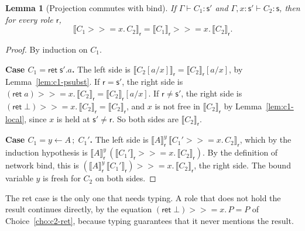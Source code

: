 \documentclass[11pt]{report}
\theoremstyle{plain}
\newtheorem{lemma}[theorem]{Lemma}
\theoremstyle{definition}
\theoremstyle{remark}
\newcommand{\kw}[1]{\mathsf{#1}}
\newcommand{\rr}{\mathsf{r}}
\newcommand{\sr}{\mathsf{s}}
\newcommand{\bind}[3]{#1 \leftarrow #2\,;\;#3}
\newcommand{\cret}[1]{\kw{ret}\;#1}
\newcommand{\mbind}[3]{#1 \mathbin{>\!\!>\!\!=} #2.\,#3}
\newcommand{\proj}[2]{\llbracket #1 \rrbracket_{#2}}
\newcommand{\pre}[3]{\llbracket #1 \rrbracket^{#2}_{#3}}
\newcommand{\case}[1]{\medskip\noindent\textbf{Case #1.}\;}
\begin{document}
\begin{lemma}[Projection commutes with bind]\label{lem:c2-pbind}
  If $\Gamma\vdash C_1:\sr'$ and $\Gamma,x{:}\sr'\vdash C_2:\sr$, then for
  every role $\rr$,
  \[
    \proj{\mbind{C_1}{x}{C_2}}{\rr} = \mbind{\proj{C_1}{\rr}}{x}{\proj{C_2}{\rr}}.
  \]
\end{lemma}
\begin{proof}
  By induction on $C_1$.

  \case{$C_1=\cret{\sr'.a}$}
  The left side is $\proj{C_2[a/x]}{\rr}=\proj{C_2}{\rr}[a/x]$, by
  Lemma~\ref{lem:c1-psubst}.  If $\rr=\sr'$, the right side is
  $\mbind{(\kw{ret}\;a)}{x}{\proj{C_2}{\rr}}=\proj{C_2}{\rr}[a/x]$.  If
  $\rr\neq\sr'$, the right side is
  $\mbind{(\kw{ret}\;\bot)}{x}{\proj{C_2}{\rr}}=\proj{C_2}{\rr}$, and $x$ is not
  free in $\proj{C_2}{\rr}$ by Lemma~\ref{lem:c1-local}, since $x$ is held at
  $\sr'\neq\rr$.  So both sides are $\proj{C_2}{\rr}$.

  \case{$C_1=\bind{y}{A}{C_1'}$}
  The left side is
  $\pre{A}{y}{\rr}\,\proj{\mbind{C_1'}{x}{C_2}}{\rr}$, which by the induction
  hypothesis is
  $\pre{A}{y}{\rr}\,(\mbind{\proj{C_1'}{\rr}}{x}{\proj{C_2}{\rr}})$.  By the
  definition of network bind, this is
  $\mbind{(\pre{A}{y}{\rr}\,\proj{C_1'}{\rr})}{x}{\proj{C_2}{\rr}}$, the right
  side.  The bound variable $y$ is fresh for $C_2$ on both sides.
\end{proof}

The ret case is the only one that needs typing.  A role that does not hold
the result continues directly, by the equation
$\mbind{(\kw{ret}\;\bot)}{x}{P}=P$ of Choice~\ref{cho:c2-ret}, because typing
guarantees that it never mentions the result.
\end{document}
